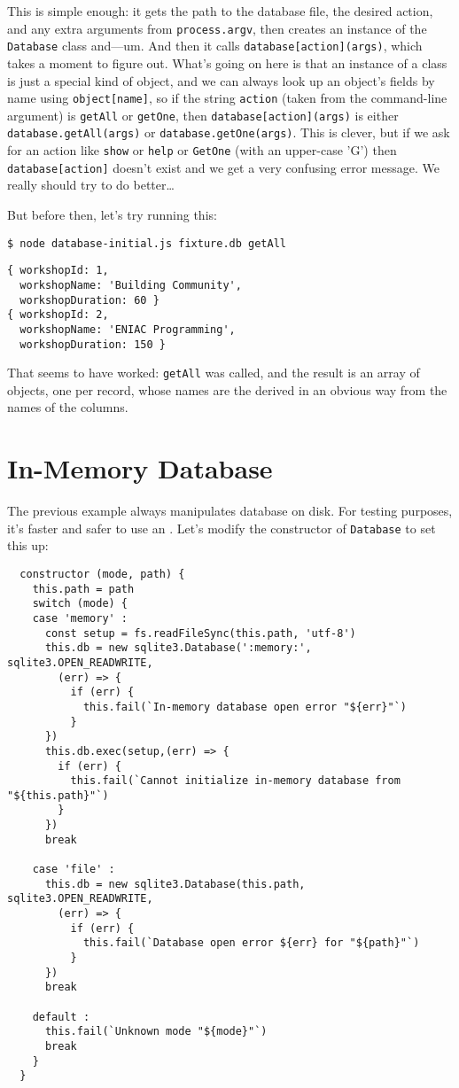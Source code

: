 This is simple enough:
it gets the path to the database file,
the desired action,
and any extra arguments from \texttt{process.argv},
then creates an instance of the \texttt{Database} class and---um.
And then it calls \texttt{database[action](args)},
which takes a moment to figure out.
What's going on here is that an instance of a class is just a special kind of object,
and we can always look up an object's fields by name using \texttt{object[name]},
so if the string \texttt{action} (taken from the command-line argument) is \texttt{getAll} or \texttt{getOne},
then \texttt{database[action](args)} is either \texttt{database.getAll(args)} or \texttt{database.getOne(args)}.
This  is  clever, but if we ask for an action like \texttt{show} or \texttt{help} or \texttt{GetOne}
(with an upper-case 'G')
then \texttt{database[action]} doesn't exist and we get a very confusing error message.
We really should try to do better{\ldots}

But before then,
let's try running this:

\begin{verbatim}
$ node database-initial.js fixture.db getAll
\end{verbatim}

\begin{verbatim}
{ workshopId: 1,
  workshopName: 'Building Community',
  workshopDuration: 60 }
{ workshopId: 2,
  workshopName: 'ENIAC Programming',
  workshopDuration: 150 }
\end{verbatim}

\noindent
That seems to have worked:
\texttt{getAll} was called,
and the result is an array of objects,
one per record,
whose names are the derived in an obvious way from the names of the columns.

\section{In-Memory Database}\label{s:db-in-memory}

The previous example always manipulates database on disk.
For testing purposes,
it's faster and safer to use an .
Let's modify the constructor of \texttt{Database} to set this up:

\begin{verbatim}
  constructor (mode, path) {
    this.path = path
    switch (mode) {
    case 'memory' :
      const setup = fs.readFileSync(this.path, 'utf-8')
      this.db = new sqlite3.Database(':memory:', sqlite3.OPEN_READWRITE,
        (err) => {
          if (err) {
            this.fail(`In-memory database open error "${err}"`)
          }
      })
      this.db.exec(setup,(err) => {
        if (err) {
          this.fail(`Cannot initialize in-memory database from "${this.path}"`)
        }
      })
      break

    case 'file' :
      this.db = new sqlite3.Database(this.path, sqlite3.OPEN_READWRITE,
        (err) => {
          if (err) {
            this.fail(`Database open error ${err} for "${path}"`)
          }
      })
      break

    default :
      this.fail(`Unknown mode "${mode}"`)
      break
    }
  }
\end{verbatim}

